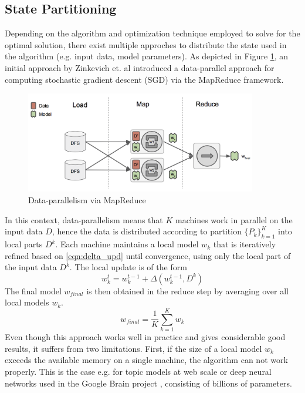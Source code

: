 \subsection{State Partitioning}
Depending on the algorithm and optimization technique employed to solve for the optimal solution, there exist multiple approches to distribute the state used in the algorithm (e.g. input data, model parameters).
As depicted in Figure \ref{fig:data_parallelism}, an initial approach by Zinkevich et. al \cite{zinkevich2010parallelized} introduced a data-parallel approach for computing stochastic gradient descent (SGD) via the MapReduce framework.
\begin{figure}[h]
\centering
\includegraphics[width=0.9\textwidth]{img/data_parallelism.png}
\caption{Data-parallelism via MapReduce}
\label{fig:data_parallelism}
\end{figure}
In this context, data-parallelism means that $K$ machines work in parallel on the input data $D$, hence the data is distributed according to partition $\{P_k\}_{k=1}^K$ into local parts $D^k$.
Each machine maintains a local model $w_k$ that is iteratively refined based on \ref{eqn:delta_upd} until convergence, using only the local part of the input data $D^k$.
The local update is of the form
\begin{equation}
w_k^{t} = w_k^{t-1} + \Delta(w_k^{t-1},D^k)
\label{eqn:local_delta_upd}
\end{equation}
The final model $w_{final}$ is then obtained in the reduce step by averaging over all local models $w_{k}$.
\begin{equation}
w_{final} = \frac{1}{K}\sum_{k=1}^{K}w_{k}
\label{eqn:avg_sgd}
\end{equation}
Even though this approach works well in practice and gives considerable good results, it suffers from two limitations.
First, if the size of a local model $w_k$ exceeds the available memory on a single machine, the algorithm can not work properly.
This is the case e.g. for topic models at web scale or deep neural networks used in the Google Brain project \cite{dean2012large}, consisting of billions of parameters.
